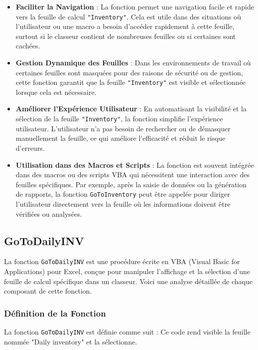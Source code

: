 \documentclass[a4paper, oneside, 12pt, final]{extreport}
\begin{document}
\begin{itemize}
    \item \textbf{Faciliter la Navigation} : La fonction permet une navigation facile et rapide vers la feuille de calcul \texttt{"Inventory"}. Cela est utile dans des situations où l'utilisateur ou une macro a besoin d'accéder rapidement à cette feuille, surtout si le classeur contient de nombreuses feuilles ou si certaines sont cachées.
    \item \textbf{Gestion Dynamique des Feuilles} : Dans les environnements de travail où certaines feuilles sont masquées pour des raisons de sécurité ou de gestion, cette fonction garantit que la feuille \texttt{"Inventory"} est visible et sélectionnée lorsque cela est nécessaire.
    \item \textbf{Améliorer l'Expérience Utilisateur} : En automatisant la visibilité et la sélection de la feuille \texttt{"Inventory"}, la fonction simplifie l'expérience utilisateur. L'utilisateur n'a pas besoin de rechercher ou de démasquer manuellement la feuille, ce qui améliore l'efficacité et réduit le risque d'erreurs.
    \item \textbf{Utilisation dans des Macros et Scripts} : La fonction est souvent intégrée dans des macros ou des scripts VBA qui nécessitent une interaction avec des feuilles spécifiques. Par exemple, après la saisie de données ou la génération de rapports, la fonction \texttt{GoToInventory} peut être appelée pour diriger l'utilisateur directement vers la feuille où les informations doivent être vérifiées ou analysées.
\end{itemize}
\subsection{GoToDailyINV}

La fonction \texttt{GoToDailyINV} est une procédure écrite en VBA (Visual Basic for Applications) pour Excel, conçue pour manipuler l'affichage et la sélection d'une feuille de calcul spécifique dans un classeur. Voici une analyse détaillée de chaque composant de cette fonction.

\subsubsection{Définition de la Fonction}

La fonction \texttt{GoToDailyINV} est définie comme suit :
Ce code rend visible la feuille nommée "Daily inventory" et la sélectionne.
\end{document}
